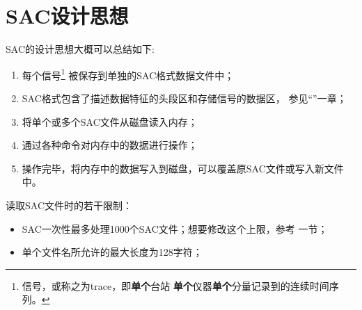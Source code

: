 \section{SAC设计思想}
SAC的设计思想大概可以总结如下:
\begin{enumerate}
\item 每个信号\footnote{信号，或称之为trace，即\textbf{单个}台站
    \textbf{单个}仪器\textbf{单个}分量记录到的连续时间序列。}
    被保存到单独的SAC格式数据文件中；
\item SAC格式包含了描述数据特征的头段区和存储信号的数据区，
    参见``''一章；
\item 将单个或多个SAC文件从磁盘读入内存；
\item 通过各种命令对内存中的数据进行操作；
\item 操作完毕，将内存中的数据写入到磁盘，可以覆盖原SAC文件或写入新文件中。
\end{enumerate}

读取SAC文件时的若干限制：
\begin{itemize}
\item SAC一次性最多处理1000个SAC文件；想要修改这个上限，参考
     一节；
\item 单个文件名所允许的最大长度为128字符；
\end{itemize}
